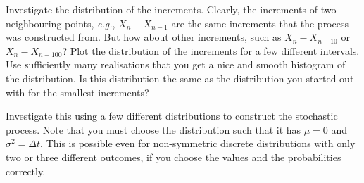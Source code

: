 \documentclass[a4paper]{article}
\begin{document}
Investigate the distribution of the increments. Clearly, the increments of two neighbouring points, \emph{e.g.}, $X_n - X_{n-1}$ are the same increments that the process was constructed from. But how about other increments, such as $X_n - X_{n-10}$ or $X_n - X_{n-100}$? Plot the distribution of the increments for a few different intervals. Use sufficiently many realisations that you get a nice and smooth histogram of the distribution. Is this distribution the same as the distribution you started out with for the smallest increments?

Investigate this using a few different distributions to construct the stochastic process. Note that you must choose the distribution such that it has $\mu=0$ and $\sigma^2=\Delta t$. This is possible even for non-symmetric discrete distributions with only two or three different outcomes, if you choose the values and the probabilities correctly.
\end{document}

